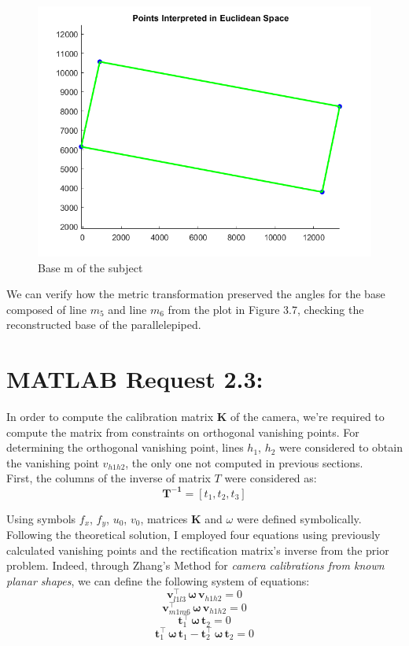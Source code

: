 \documentclass{Configuration_Files/PoliMi3i_thesis}
\begin{document}
\begin{figure}[H]
    \centering
    \includegraphics[width=0.5\linewidth]{Project Template/Images/basem.png}
    \caption{Base m of the subject}
    \label{fig:enter-label}
\end{figure}

We can verify how the metric transformation preserved the angles for the base composed of line \( m_5 \) and line \( m_6 \) from the plot in Figure 3.7, checking the reconstructed base of the parallelepiped.



\newpage
\section{MATLAB Request 2.3: }

In order to compute the calibration matrix \textbf{K} of the camera, we're required to compute the matrix from constraints on orthogonal vanishing points.
For determining the orthogonal vanishing point, lines $h_1$, $h_2$ were considered to obtain the vanishing point $v_{h1h2}$, the only one not computed in previous sections.
\\First, the columns of the inverse of matrix $T$ were considered as:
\[
\mathbf{T^{-1}} = [t_1, t_2, t_3]
\]

Using symbols $f_x$, $f_y$, $u_0$, $v_0$, matrices $\mathbf{K}$ and $\omega$ were defined symbolically. Following the theoretical solution, I employed four equations using previously calculated vanishing points and the rectification matrix's inverse from the prior problem. Indeed, through Zhang's Method for \textit{camera calibrations from known planar shapes}, we can define the following system of equations:
\[
\mathbf{v}_{l1l3}^\top \, \boldsymbol{\omega} \, \mathbf{v}_{h1h2} = 0
\]
\[
\mathbf{v}_{m1m6}^\top \, \boldsymbol{\omega} \, \mathbf{v}_{h1h2} = 0 
\]
\[
\mathbf{t}_1^\top \, \boldsymbol{\omega} \, \mathbf{t}_2 = 0
\]
\[
\mathbf{t}_1^\top \, \boldsymbol{\omega} \, \mathbf{t}_1 - \mathbf{t}_2^\top \, \boldsymbol{\omega} \, \mathbf{t}_2 = 0
\]
\end{document}
